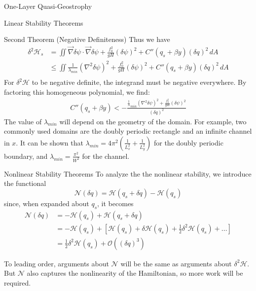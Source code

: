 \documentclass[12pt]{article}
\begin{document}
\begin{section}{One-Layer Quasi-Geostrophy}
\begin{subsection}{Linear Stability Theorems}
\begin{subsubsection}{Second Theorem (Negative Definiteness)}
            Thus we have
            \begin{align*}
                \delta^2\mathcal{H}_s
                &= \iint \vec\nabla \delta \psi \cdot \vec \nabla \delta \psi + \frac{f_0^2}{gH} (\delta \psi)^2+  C''(q_s + \beta y) (\delta q)^2  \, dA \\
                &\le \iint \frac{1}{\lambda_{min}}(\nabla^2\delta\psi)^2 + \frac{f_0^2}{gH} (\delta \psi)^2+  C''(q_s + \beta y) (\delta q)^2  \, dA \\
            \end{align*}
            For $\delta^2\mathcal{H}$ to be negative definite, the integrand must be negative everywhere. By factoring this homogeneous polynomial, we find:
            \begin{align*}
                C''(q_s + \beta y) < -\frac{\frac1\lambda_{min}(\nabla^2\delta\psi)^2 + \frac{f_0^2}{gH}(\delta\psi)^2}{(\delta q)^2}
            \end{align*}
            The value of $\lambda_{min}$ will depend on the geometry of the domain. For example, two commonly used domains are the doubly periodic rectangle and an infinite channel in $x$.
            It can be shown that $\lambda_{min} = 4\pi^2(\frac1{L_x^2} + \frac1{L_y^2})$ for the doubly periodic boundary, and $\lambda_{min} = \frac{\pi^2}{W^2}$ for the channel.
        \end{subsubsection}
    \end{subsection}

    \begin{subsection}{Nonlinear Stability Theorems}
        To analyze the the nonlinear stability, we introduce the functional
        $$
        \mathcal{N}(\delta q)  = \mathcal{H}(q_s + \delta q) - \mathcal{H}(q_s)
        $$
        since, when expanded about $q_s$, it becomes
        \begin{align*}
            \mathcal{N}(\delta q)
            &= - \mathcal{H}(q_s) + \mathcal{H}(q_s + \delta q) \\
            & = - \mathcal{H}(q_s) + \left[ \mathcal{H}(q_s) + \delta \mathcal{H}(q_s)+ \frac12 \delta^2 \mathcal{H}(q_s) + ... \right] \\
            &= \frac12 \delta^2 \mathcal{H}(q_s) + \mathcal{O}((\delta q)^3)
        \end{align*}

        To leading order, arguments about $\mathcal{N}$ will be the same as arguments about $\delta^2 \mathcal{H}$. But $\mathcal{N}$ also captures the nonlinearity of the Hamiltonian, so more work will be required.


\end{subsection}
\end{section}
\end{document}
